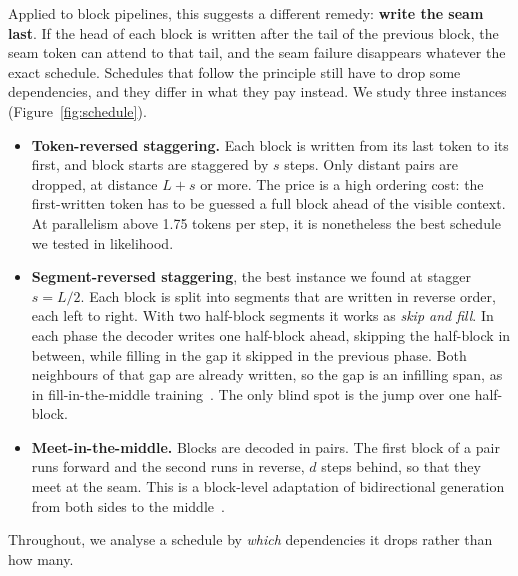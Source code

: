 \documentclass[11pt]{article}
\theoremstyle{definition}
\theoremstyle{remark}
\begin{document}
Applied to block pipelines, this suggests a different remedy: \textbf{write the seam last}.
If the head of each block is written after the tail of the previous block, the seam token can attend to that tail, and the seam failure disappears whatever the exact schedule.
Schedules that follow the principle still have to drop some dependencies, and they differ in what they pay instead.
We study three instances (Figure~\ref{fig:schedule}).
\begin{itemize}
  \item[(a)] \textbf{Token-reversed staggering.} Each block is written from its last token to its first, and block starts are staggered by $s$ steps. Only distant pairs are dropped, at distance $L+s$ or more. The price is a high ordering cost: the first-written token has to be guessed a full block ahead of the visible context. At parallelism above 1.75 tokens per step, it is nonetheless the best schedule we tested in likelihood.
  \item[(b)] \textbf{Segment-reversed staggering}, the best instance we found at stagger $s=L/2$. Each block is split into segments that are written in reverse order, each left to right. With two half-block segments it works as \emph{skip and fill}. In each phase the decoder writes one half-block ahead, skipping the half-block in between, while filling in the gap it skipped in the previous phase. Both neighbours of that gap are already written, so the gap is an infilling span, as in fill-in-the-middle training~\citep{bavarian2022fim}. The only blind spot is the jump over one half-block.
  \item[(c)] \textbf{Meet-in-the-middle.} Blocks are decoded in pairs. The first block of a pair runs forward and the second runs in reverse, $d$ steps behind, so that they meet at the seam. This is a block-level adaptation of bidirectional generation from both sides to the middle~\citep{zhou2019bothsides,zhou2019sbnmt,zhang2020interleaved}.
\end{itemize}
Throughout, we analyse a schedule by \emph{which} dependencies it drops rather than how many.
\end{document}

